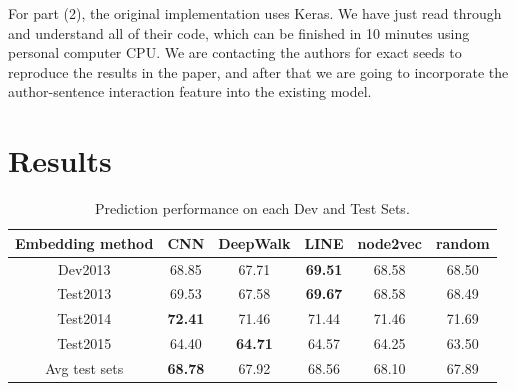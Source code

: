 \documentclass{article} %
\begin{document}
For part (2), the original implementation uses Keras. We have just read through and understand all of their code, which can be finished in 10 minutes using personal computer CPU. 
We are contacting the authors for exact seeds to reproduce the results in the paper, and after that we are going to incorporate the author-sentence interaction feature into the existing model. 



\section{Results}

\begin{table}[htbp]
\begin{center}
\begin{tabular}{|c|c|c c c c|}
\hline
Embedding method & CNN & DeepWalk & LINE & node2vec & random\\
\hline
Dev2013  & 68.85 & 67.71 & \textbf{69.51} & 68.58 & 68.50 \\
\hline
Test2013  & 69.53 & 67.58 & \textbf{69.67} & 68.58 & 68.49 \\
Test2014  & \textbf{72.41} & 71.46 & 71.44 & 71.46 & 71.69 \\
Test2015  & 64.40 & \textbf{64.71} & 64.57 & 64.25 & 63.50 \\
\hline
Avg test sets & \textbf{68.78}& 67.92 & 68.56  & 68.10 & 67.89 \\
\hline
\end{tabular}
\end{center}
\caption{Prediction performance on each Dev and Test Sets. }
\label{Tb:}
\end{table}%



 

\end{document}
